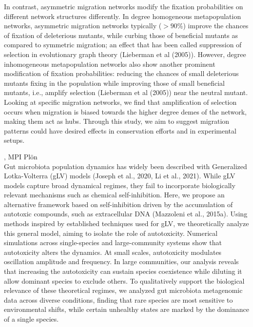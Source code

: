 \documentclass[12pt,a4paper]{article}
\begin{document}
 In contrast, asymmetric migration networks modify the fixation probabilities on different network structures differently. In degree homogeneous metapopulation networks, asymmetric migration networks typically ($>90$\%) improve the chances of fixation of deleterious mutants, while curbing those of beneficial mutants as compared to symmetric migration; an effect that has been called suppression of selection in evolutionary graph theory (Lieberman et al (2005)). However, degree inhomogeneous metapopulation networks also show another prominent modification of fixation probabilities: reducing the chances of small deleterious mutants fixing in the population while improving those of small beneficial mutants, i.e., amplify selection (Lieberman et al (2005)) near the neutral mutant. Looking at specific migration networks, we find that amplification of selection occurs when migration is biased towards the higher degree demes of the network, making them act as hubs. Through this study, we aim to suggest migration patterns could have desired effects in conservation efforts and in experimental setups. 

\bigskip\bigskip

, MPI Plön \\[2ex] Gut microbiota population dynamics has widely been described with Generalized Lotka-Volterra (gLV) models (Joseph et al., 2020, Li et al., 2021). While gLV models capture broad dynamical regimes, they fail to incorporate biologically relevant mechanisms such as chemical self-inhibition. Here, we propose an alternative framework based on self-inhibition driven by the accumulation of autotoxic compounds, such as extracellular DNA (Mazzoleni et al., 2015a). Using methods inspired by established techniques used for gLV, we theoretically analyze this general model, aiming to isolate the role of autotoxicity. Numerical simulations across single-species and large-community systems show that autotoxicity alters the dynamics. At small scales, autotoxicity modulates oscillation amplitude and frequency. In large communities, our analysis reveals that increasing the autotoxicity can sustain species coexistence while diluting it allow dominant species to exclude others. To qualitatively support the biological relevance of these theoretical regimes, we analyzed gut microbiota metagenomic data across diverse conditions, finding that rare species are most sensitive to environmental shifts, while certain unhealthy states are marked by the dominance of a single species.
\end{document}
